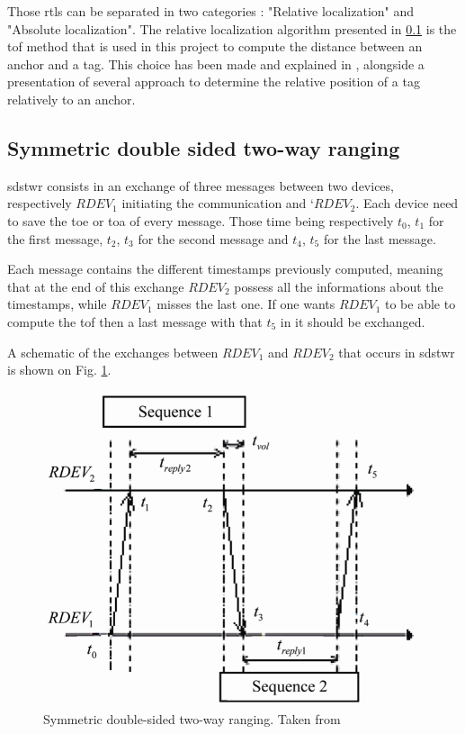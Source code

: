 Those \gls{rtls} can be separated in two categories : "Relative localization" and "Absolute localization". The relative localization algorithm presented in \ref{sds2wr} is the \gls{tof} method that is used in this project to compute the distance between an anchor and a tag. This choice has been made and explained in \cite{fesler2018high}, \cite{hannotier2019indoor} alongside a presentation of several approach to determine the relative position of a tag relatively to an anchor.


\subsection{Symmetric double sided two-way ranging}
\label{sds2wr}

\gls{sdstwr} consists in an exchange of three messages between two devices, respectively $RDEV_1$ initiating the communication and `$RDEV_2$. Each device need to save the \gls{toe} or \gls{toa} of every message. Those time being respectively $t_0$, $t_1$ for the first message, $t_2$, $t_3$ for the second message and $t_4$, $t_5$ for the last message.
\vspace{2mm}

Each message contains the different timestamps previously computed, meaning that at the end of this exchange $RDEV_2$ possess all the informations about the timestamps, while $RDEV_1$ misses the last one. If one wants $RDEV_1$ to be able to compute the \gls{tof} then a last message with that $t_5$ in it should be exchanged.
\vspace{2mm}

A schematic of the exchanges between $RDEV_1$ and $RDEV_2$ that occurs in \gls{sdstwr} is shown on Fig. \ref{sdstwr}. 

\begin{figure}[H]
\centering
\includegraphics[width=.6\linewidth]{Images/sds-twr.png}
\caption{Symmetric double-sided two-way ranging. Taken from \cite{dalce2011comparison}}
\label{sdstwr}
\end{figure}

